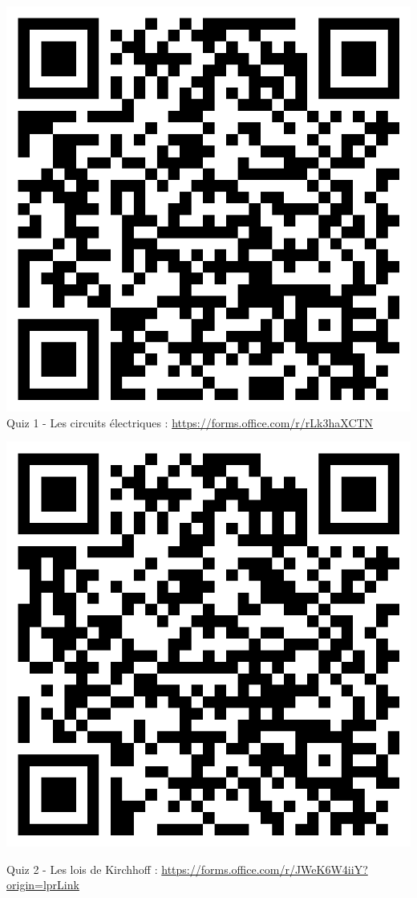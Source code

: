 \documentclass[french, a4paper, 12pt]{article}
\begin{document}
	\begin{minipage}{.2\textwidth}
		\centering
		\includegraphics[width=1\textwidth]{Quiz1.png}
		\protect Quiz 1 - Les circuits électriques : \url{https://forms.office.com/r/rLk3haXCTN}
	\end{minipage}\hfill
	\begin{minipage}{.3\textwidth}
		\centering
		\includegraphics[width=.7\textwidth]{Quiz2.png}

		Quiz 2 - Les lois de Kirchhoff : \url{https://forms.office.com/r/JWeK6W4iiY?origin=lprLink}
	\end{minipage}\hfill
\end{document}

